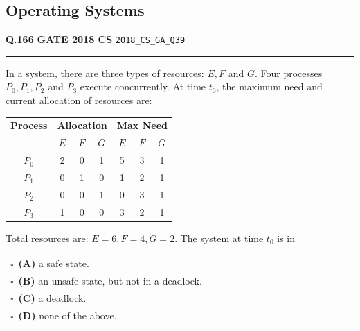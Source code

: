 \documentclass[a4paper,10pt]{article}
\begin{document}
\subsection*{Operating Systems}
\vspace{-4pt}
\noindent
\begin{tcolorbox}[
    blanker,
    sidebyside,
    sidebyside align=top,
    lefthand width=0.55\textwidth,
    top=4pt, bottom=4pt, left=0pt, right=0pt,
    middle=16pt,
    underlay={
        \draw[dashed, black!80, line width=0.8pt, dash pattern=on 4pt off 3pt]
            ([xshift=0.55\textwidth+8pt]frame.north west) --
            ([xshift=0.55\textwidth+8pt]frame.south west);
    }
]
\textbf{Q.166}  \hfill {\footnotesize\textbf{GATE 2018 CS} \quad \tiny\texttt{2018\_CS\_GA\_Q39}}
\vspace{2pt}\hrule height 0.3pt\vspace{4pt}

In a system, there are three types of resources: $E, F$ and $G$. Four processes $P_0, P_1, P_2$ and $P_3$ execute concurrently. At time $t_0$, the maximum need and current allocation of resources are:
\begin{center}
\begin{tabular}{c|ccc|ccc}
\textbf{Process} & \multicolumn{3}{c|}{\textbf{Allocation}} & \multicolumn{3}{c}{\textbf{Max Need}} \\
& $E$ & $F$ & $G$ & $E$ & $F$ & $G$ \\
\hline
$P_0$ & 2 & 0 & 1 & 5 & 3 & 1 \\
$P_1$ & 0 & 1 & 0 & 1 & 2 & 1 \\
$P_2$ & 0 & 0 & 1 & 0 & 3 & 1 \\
$P_3$ & 1 & 0 & 0 & 3 & 2 & 1 \\
\end{tabular}
\end{center}
Total resources are: $E = 6, F = 4, G = 2$. The system at time $t_0$ is in

\par\vspace{6pt}\noindent
\begin{tabular}{@{}p{0.98\linewidth}@{}}
$\square$\ \textbf{(A)} a safe state. \\
\addlinespace[3pt]
$\square$\ \textbf{(B)} an unsafe state, but not in a deadlock. \\
\addlinespace[3pt]
$\square$\ \textbf{(C)} a deadlock. \\
\addlinespace[3pt]
$\square$\ \textbf{(D)} none of the above.
\end{tabular}


\end{tcolorbox}
\end{document}
